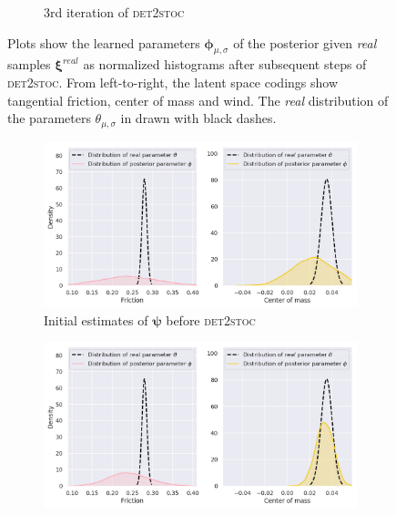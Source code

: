 \documentclass{kththesis}
\newcommand{\vph}{\boldsymbol{\phi}}
\newcommand{\vpsi}{\vec{\psi}}
\renewcommand{\vec}[1]{\boldsymbol{#1}}
\newcommand{\dettostoc}{\textsc{det2stoc}}
\begin{document}
\begin{figure}
\begin{subfigure}{\textwidth}
  \caption{3rd iteration of \dettostoc{}}
\end{subfigure}
\caption{Plots show the learned parameters $\vph_{\mu, \sigma}$ of the posterior given \emph{real} samples $\vec{\xi}^{real}$ as normalized histograms after subsequent steps of \dettostoc{}.
From left-to-right, the latent space codings show tangential friction, center of mass and wind. %
The \emph{real} distribution of the parameters $\theta_{\mu, \sigma}$ in drawn with black dashes.}
\label{fig:windyslope_latent_space_full}
\end{figure}

\begin{figure}
\centering
{}
\captionsetup{size=footnotesize}
\begin{subfigure}{0.45\textwidth}
  \includegraphics[width=\textwidth]{img/yumi/latent-representation/yumi_latent_encoding_0_iter}%
  \caption{Initial estimates of $\vpsi$ before \dettostoc{}}
\end{subfigure}
\begin{subfigure}{0.45\textwidth}
  \centering
  \includegraphics[width=\linewidth]{img/yumi/latent-representation/yumi_latent_encoding_1_iter}

\end{subfigure}
\end{figure}
\end{document}
